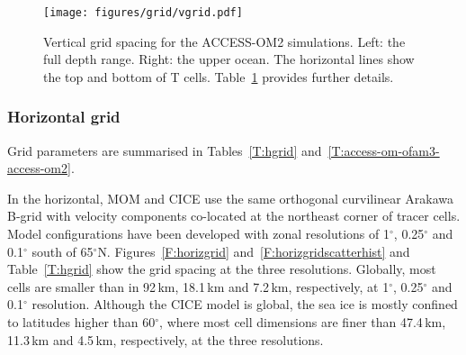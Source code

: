 \documentclass[11pt]{article}
\begin{document}
\begin{figure}[htp]
\texttt{[image: figures/grid/vgrid.pdf]}
\caption[Vertical grid spacing for the ACCESS-OM2 simulations.]{Vertical grid spacing for the ACCESS-OM2 simulations. 
Left: the full depth range. 
Right: the upper ocean. 
The horizontal lines show the top and bottom of T cells.
Table~\ref{F:vgrid} provides further details.}
\label{F:vgrid}
\end{figure}

\subsubsection{Horizontal grid}\label{S:horizgrid}

Grid parameters are summarised in Tables~\ref{T:hgrid} and~\ref{T:access-om-ofam3-access-om2}.

In the horizontal, MOM and CICE use the same orthogonal curvilinear Arakawa B-grid with velocity components co-located at the northeast corner of tracer cells. 
Model configurations have been developed with zonal resolutions of 1$^\circ$, 0.25$^\circ$ and 0.1$^\circ$ south of 65$^\circ$N.
Figures~\ref{F:horizgrid} and~\ref{F:horizgridscatterhist} and Table~\ref{T:hgrid} show the grid spacing at the three resolutions.
Globally, most cells are smaller than in 92\,km, 18.1\,km and 7.2\,km, respectively, at 1$^\circ$, 0.25$^\circ$ and 0.1$^\circ$ resolution.
Although the CICE model is global, the sea ice is mostly confined to latitudes higher than 60$^\circ$, where most cell dimensions are finer than 47.4\,km, 11.3\,km and 4.5\,km, respectively, at the three resolutions.
\end{document}

